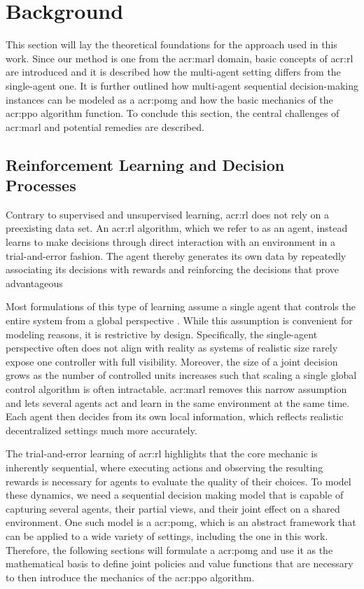\chapter{Background}
\label{chap: background}

This section will lay the theoretical foundations for the approach used in this work. Since our method is one from the \gls{acr:marl} domain, basic concepts of \gls{acr:rl} are introduced and it is described how the multi-agent setting differs from the single-agent one. It is further outlined how multi-agent sequential decision-making instances can be modeled as a \gls{acr:pomg} and how the basic mechanics of the \gls{acr:ppo} algorithm function. To conclude this section, the central challenges of \gls{acr:marl} and potential remedies are described.\\

\section{Reinforcement Learning and Decision Processes}
\label{sec:rl-decision-processes}
Contrary to supervised and unsupervised learning, \gls{acr:rl} does not rely on a preexisting data set. An \gls{acr:rl} algorithm, which we refer to as an agent, instead learns to make decisions through direct interaction with an environment in a trial-and-error fashion. The agent thereby generates its own data by repeatedly associating its decisions with rewards and reinforcing the decisions that prove advantageous \citep{Sutton1998}

Most formulations of this type of learning assume a single agent that controls the entire system from a global perspective \citep{Brunton2022}. While this assumption is convenient for modeling reasons, it is restrictive by design. Specifically, the single-agent perspective often does not align with reality as systems of realistic size rarely expose one controller with full visibility. Moreover, the size of a joint decision grows as the number of controlled units increases such that scaling a single global control algorithm is often intractable. \gls{acr:marl} removes this narrow assumption and lets several agents act and learn in the same environment at the same time. Each agent then decides from its own local information, which reflects realistic decentralized settings much more accurately. 

The trial-and-error learning of \gls{acr:rl} highlights that the core mechanic is inherently sequential, where executing actions and observing the resulting rewards is necessary for agents to evaluate the quality of their choices. To model these dynamics, we need a sequential decision making model that is capable of capturing several agents, their partial views, and their joint effect on a shared environment. One such model is a \gls{acr:pomg}, which is an abstract framework that can be applied to a wide variety of settings, including the one in this work. Therefore, the following sections will formulate a \gls{acr:pomg} and use it as the mathematical basis to define joint policies and value functions that are necessary to then introduce the mechanics of the \gls{acr:ppo} algorithm.\\


